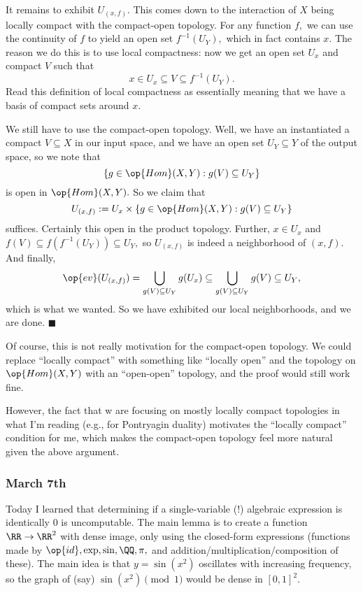 It remains to exhibit $U_{(x,f)}.$ This comes down to the interaction of $X$ being locally compact with the compact-open topology. For any function $f,$ we can use the continuity of $f$ to yield an open set $f^{-1}(U_Y),$ which in fact contains $x.$ The reason we do this is to use local compactness: now we get an open set $U_x$ and compact $V$ such that
\[x\in U_x\subseteq V\subseteq f^{-1}(U_Y).\]
Read this definition of local compactness as essentially meaning that we have a basis of compact sets around $x.$

We still have to use the compact-open topology. Well, we have an instantiated a compact $V\subseteq X$ in our input space, and we have an open set $U_Y\subseteq Y$ of the output space, so we note that
\[\{g\in\op{Hom}(X,Y):g(V)\subseteq U_Y\}\]
is open in $\op{Hom}(X,Y).$ So we claim that
\[U_{(x,f)}:=U_x\times\{g\in\op{Hom}(X,Y):g(V)\subseteq U_Y\}\]
suffices. Certainly this open in the product topology. Further, $x\in U_x$ and $f(V)\subseteq f(f^{-1}(U_Y))\subseteq U_Y,$ so $U_{(x,f)}$ is indeed a neighborhood of $(x,f).$ And finally,
\[\op{ev}(U_{(x,f)})=\bigcup_{g(V)\subseteq U_Y}g(U_x)\subseteq\bigcup_{g(V)\subseteq U_Y}g(V)\subseteq U_Y,\]
which is what we wanted. So we have exhibited our local neighborhoods, and we are done. $\blacksquare$

Of course, this is not really motivation for the compact-open topology. We could replace ``locally compact'' with something like ``locally open'' and the topology on $\op{Hom}(X,Y)$ with an ``open-open'' topology, and the proof would still work fine.

However, the fact that w are focusing on mostly locally compact topologies in what I'm reading (e.g., for Pontryagin duality) motivates the ``locally compact'' condition for me, which makes the compact-open topology feel more natural given the above argument.

\subsubsection{March 7th}
Today I learned that determining if a single-variable (!) algebraic expression is identically $0$ is uncomputable. The main lemma is to create a function $\RR\to\RR^2$ with dense image, only using the closed-form expressions (functions made by $\op{id},\exp,\sin,\QQ,\pi,$ and addition/multiplication/composition of these). The main idea is that $y=\sin\left(x^2\right)$ oscillates with increasing frequency, so the graph of (say) $\sin\left(x^2\right)\pmod1$ would be dense in $[0,1]^2.$

